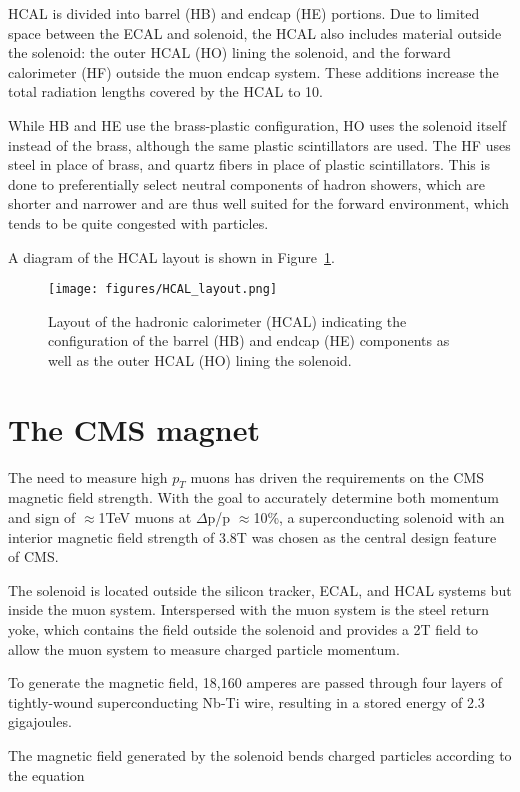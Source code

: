 HCAL is divided into barrel (HB) and endcap (HE) portions. Due to limited space between the ECAL and solenoid, the HCAL also includes material outside the solenoid: the outer HCAL (HO) lining the solenoid, and the forward calorimeter (HF) outside the muon endcap system. These additions increase the total radiation lengths covered by the HCAL to 10.

While HB and HE use the brass-plastic configuration, HO uses the solenoid itself instead of the brass, although the same plastic scintillators are used. The HF uses steel in place of brass, and quartz fibers in place of plastic scintillators. This is done to preferentially select neutral components of hadron showers, which are shorter and narrower and are thus well suited for the forward environment, which tends to be quite congested with particles.

A diagram of the HCAL layout is shown in Figure~\ref{fig:HCAL_layout}.

\begin{figure}\centering
  \texttt{[image: figures/HCAL\_layout.png]}
  \caption{\label{fig:HCAL_layout} Layout of the hadronic calorimeter (HCAL) indicating the configuration of the barrel (HB) and endcap (HE) components as well as the outer HCAL (HO) lining the solenoid.}
\end{figure}

\section{The CMS magnet}

The need to measure high $p_{T}$ muons has driven the requirements on the CMS magnetic field strength. With the goal to accurately determine both momentum and sign of $\approx$1TeV muons at $\Delta$p/p $\approx $10\%, a superconducting solenoid with an interior magnetic field strength of 3.8T was chosen as the central design feature of CMS.

The solenoid is located outside the silicon tracker, ECAL, and HCAL systems but inside the muon system. Interspersed with the muon system is the steel return yoke, which contains the field outside the solenoid and provides a 2T field to allow the muon system to measure charged particle momentum. 

To generate the magnetic field, 18,160 amperes are passed through four layers of tightly-wound superconducting Nb-Ti wire, resulting in a stored energy of 2.3 gigajoules.

The magnetic field generated by the solenoid bends charged particles according to the equation

